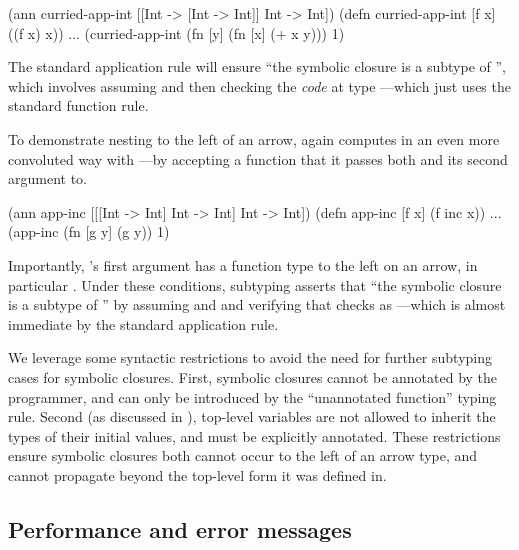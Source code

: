 \begin{cljlisting}
(ann curried-app-int [[Int -> [Int -> Int]] Int -> Int])
(defn curried-app-int [f x] ((f x) x))
...
(curried-app-int (fn [y] (fn [x] (+ x y))) 1)
\end{cljlisting}

The standard application rule will ensure 
``the symbolic closure 
is a subtype of
'', which involves assuming
 and then checking the \emph{code} 
at type ---which just uses the standard
function rule.

To demonstrate nesting to the left of an arrow,
 again computes 
in an even more convoluted way with ---by accepting a function
 that it passes both  and its second argument to.

\begin{cljlisting}
(ann app-inc [[[Int -> Int] Int -> Int] Int -> Int])
(defn app-inc [f x] (f inc x))
...
(app-inc (fn [g y] (g y)) 1)
\end{cljlisting}

Importantly, 's first argument has a function
type to the left on an arrow, in particular .
Under these conditions, subtyping asserts that ``the symbolic
closure  is a subtype of ''
by assuming  and  and
verifying that  checks as ---which is almost immediate by
the standard application rule.

We leverage some syntactic restrictions
to avoid the need for further subtyping cases for symbolic closures.
First, symbolic closures cannot be annotated by the programmer,
and can only be introduced by the ``unannotated function'' typing rule.
Second (as discussed in ),
top-level variables are not allowed to inherit the types of their initial
values, and must be explicitly annotated.
These restrictions ensure symbolic closures both cannot occur to the
left of an arrow type, and 
cannot propagate beyond the top-level form it was defined in.

\subsection{Performance and error messages}


